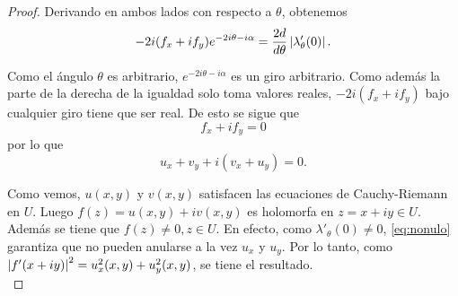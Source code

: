 \begin{proof}
    Derivando en ambos lados con respecto a $\theta$, obtenemos
    \begin{equation*}
        -2i (f_x + i f_y) e^{-2i \theta - i \alpha} = \frac{2d}{d \theta} \left\lvert\lambda_{\theta}'(0)\right\rvert.
    \end{equation*}


    Como el ángulo $\theta$ es arbitrario, $e^{-2i \theta - i \alpha}$ es un giro arbitrario. Como además la parte de la derecha de la igualdad solo toma valores reales, $-2i(f_x + i f_y)$ bajo cualquier giro tiene que ser real. De esto se sigue que
       \begin{equation*}
        f_x + i f_y = 0
    \end{equation*}
    por lo que
    \begin{equation*}
        u_x + v_y + i(v_x + u_y) = 0.
    \end{equation*}

    Como vemos, $u(x,y)$ y $v(x,y)$ satisfacen las ecuaciones de Cauchy-Riemann en $U$. Luego $f(z) = u(x,y) + i v(x,y)$ es holomorfa en $z = x + iy \in U$. Además se tiene que $f(z) \not = 0, z \in U$. En efecto, como $\lambda'_\theta(0) \neq 0$, \eqref{eq:nonulo} garantiza que no pueden anularse a la vez $u_x$ y $u_y$. Por lo tanto, como $\left\lvert f'(x+iy)\right\rvert^2 = u_x^2(x,y)+u_y^2(x,y)$, se tiene el resultado. \\
\end{proof}

